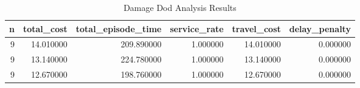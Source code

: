 \begin{table}
\caption{Damage Dod Analysis Results}
\begin{tabular}{rrrrrr}
\toprule
n & total_cost & total_episode_time & service_rate & travel_cost & delay_penalty \\
\midrule
9 & 14.010000 & 209.890000 & 1.000000 & 14.010000 & 0.000000 \\
9 & 13.140000 & 224.780000 & 1.000000 & 13.140000 & 0.000000 \\
9 & 12.670000 & 198.760000 & 1.000000 & 12.670000 & 0.000000 \\
\bottomrule
\end{tabular}
\end{table}
